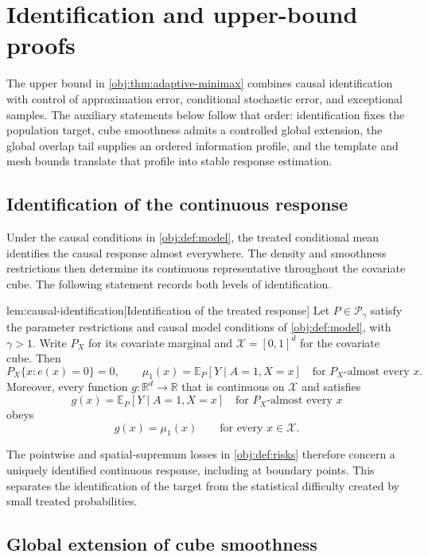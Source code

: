 \section{Identification and upper-bound proofs}

The upper bound in \cref{obj:thm:adaptive-minimax} combines causal identification with control of approximation error, conditional stochastic error, and exceptional samples. The auxiliary statements below follow that order: identification fixes the population target, cube smoothness admits a controlled global extension, the global overlap tail supplies an ordered information profile, and the template and mesh bounds translate that profile into stable response estimation.

\subsection{Identification of the continuous response}

Under the causal conditions in \cref{obj:def:model}, the treated conditional mean identifies the causal response almost everywhere. The density and smoothness restrictions then determine its continuous representative throughout the covariate cube. The following statement records both levels of identification.

\begin{lemmav}{lem:causal-identification}[Identification of the treated response]
Let \(P\in\mathcal P_\gamma\) satisfy the parameter restrictions and causal model conditions of \cref{obj:def:model}, with \(\gamma>1\). Write \(P_X\) for its covariate marginal and \(\mathcal X=[0,1]^d\) for the covariate cube. Then
\[
P_X\{x:e(x)=0\}=0,
\qquad
\mu_1(x)=\mathbb E_P[Y\mid A=1,X=x]
\quad\text{for }P_X\text{-almost every }x.
\]
Moreover, every function \(g:\mathbb R^d\to\mathbb R\) that is continuous on \(\mathcal X\) and satisfies
\[
g(x)=\mathbb E_P[Y\mid A=1,X=x]
\quad\text{for }P_X\text{-almost every }x
\]
obeys
\[
g(x)=\mu_1(x)
\qquad\text{for every }x\in\mathcal X.
\]
\end{lemmav}

The pointwise and spatial-supremum losses in \cref{obj:def:risks} therefore concern a uniquely identified continuous response, including at boundary points. This separates the identification of the target from the statistical difficulty created by small treated probabilities.

\subsection{Global extension of cube smoothness}

